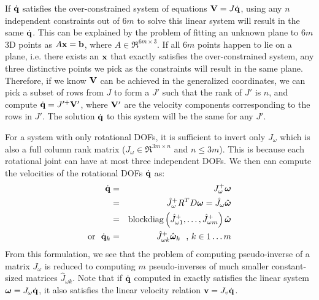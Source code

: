 If $\dot{\mathbf{q}}$ satisfies the over-constrained system of equations $\mathbf{V}
= J\dot{\mathbf{q}}$, using any $n$ independent constraints out of $6m$ to
solve this linear system will result in the same $\dot{\mathbf{q}}$. This
can be explained by the problem of fitting an unknown plane to $6m$ 3D
points as $A\mathbf{x} = \mathbf{b}$, where $A \in \Re^{6m \times 3}$. If all
$6m$ points happen to lie on a plane, i.e. there exists an $\mathbf{x}$
that exactly satisfies the over-constrained system, any three
distinctive points we pick as the constraints will result in the same
plane. Therefore, if we know $\mathbf{V}$ can be achieved in the
generalized coordinates, we can pick a subset of rows from $J$ to form
a $J'$ such that the rank of $J'$ is $n$, and compute $\dot{\mathbf{q}} =
J'^+ \mathbf{V}'$, where $\mathbf{V}'$ are the velocity components
corresponding to the rows in $J'$. The solution $\dot{\mathbf{q}}$ to this
system will be the same for any $J'$.


For a system with only rotational DOFs, it is sufficient
to invert only $J_{\omega}$ which is also a full column rank matrix
($J_{\omega} \in \Re^{3m \times n}$ and $n\leq 3m$). This is because
each rotational joint can have at most three independent DOFs.  We
then can compute the velocities of the rotational DOFs $\dot{\mathbf{q}}$
as:
\begin{eqnarray}
\label{eq:angvel_cart2gen}
\nonumber
 \dot{\mathbf{q}} & = & J_{\omega}^+ \bm{\omega}\\
 \nonumber
 & = &  \hat{J}_{\omega}^+ R^T D\bm{\omega} = \hat{J}_{\omega} \hat{\bm{\omega}} \\
\nonumber
& = & \mbox{blockdiag}\left(\hat{J}_{\omega 1}^+,\hdots,\hat{J}_{\omega m}^+\right ) \hat{\bm{\omega}}\\
\mbox{or\ \ } \dot{\mathbf{q}}_k & = & \hat{J}_{\omega k}^+ \hat{\bm{\omega}}_k \mbox{\ \ , } k \in 1\hdots m
\end{eqnarray}
From this formulation, we see that the problem of computing
pseudo-inverse of a matrix $J_{\omega}$ is reduced to computing $m$
pseudo-inverses of much smaller constant-sized matrices
$\hat{J}_{\omega k}$. Note that if $\dot{\mathbf{q}}$ computed in
 exactly satisfies the linear system
$\bm{\omega} = J_{\omega} \dot{\mathbf{q}}$, it also satisfies the linear
velocity relation $\mathbf{v} = J_v \dot{\mathbf{q}}$.



